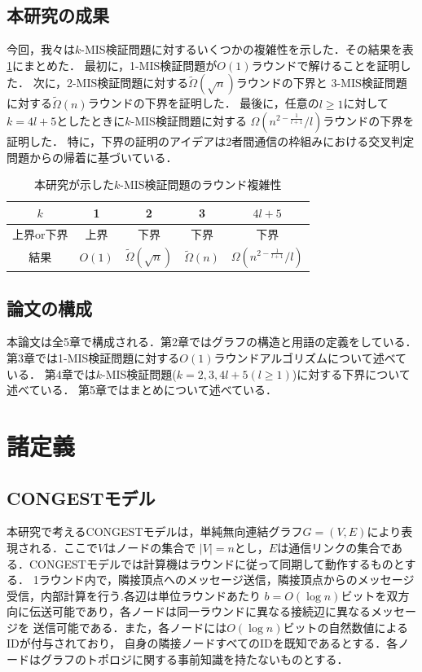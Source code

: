 \documentclass[12pt]{thesis}
\newcommand{\CONGEST}{\textsf{CONGEST}}
\theoremstyle{definition}
\begin{document}
\section{本研究の成果}
今回，我々は$k$-MIS検証問題に対するいくつかの複雑性を示した．その結果を表\ref{tab: k-MIS}にまとめた．
最初に，1-MIS検証問題が$O(1)$ラウンドで解けることを証明した．
次に，2-MIS検証問題に対する$\tilde{\Omega} (\sqrt{n})$ラウンドの下界と
3-MIS検証問題に対する$\tilde{\Omega} (n)$ラウンドの下界を証明した．
最後に，任意の$l \geq 1$に対して$k = 4l + 5$としたときに$k$-MIS検証問題に対する
$\Omega\left(n^{2 - \frac{1}{l+1}}/l\right)$ラウンドの下界を証明した．
特に，下界の証明のアイデアは2者間通信の枠組みにおける交叉判定問題からの帰着に基づいている．

\begin{table}[htb]
  \begin{center}
    \caption{本研究が示した$k$-MIS検証問題のラウンド複雑性}
    \begin{tabular}{|c||c|c|c|c|} \hline
      $k$ & 1 & 2 & 3 & $4l + 5$ \\ \hline
      上界or下界 & 上界 & 下界 & 下界 & 下界 \\ \hline
      結果 & $O(1)$ & $\tilde{\Omega} (\sqrt{n})$ & $\tilde{\Omega} (n)$ & $\Omega\left(n^{2 - \frac{1}{l+1}}/l\right)$ \\ \hline
    \end{tabular}
    \label{tab: k-MIS}
  \end{center}
\end{table}


\section{論文の構成}
本論文は全5章で構成される．第2章ではグラフの構造と用語の定義をしている．
第3章では1-MIS検証問題に対する$O(1)$ラウンドアルゴリズムについて述べている．
第4章では$k$-MIS検証問題($k = 2, 3, 4l + 5 ( l \geq 1)$)に対する下界について述べている．
第5章ではまとめについて述べている．

\chapter{諸定義}

\section{{\CONGEST}モデル}
本研究で考える{\CONGEST}モデルは，単純無向連結グラフ$G = (V, E)$により表現される．ここで$V$はノードの集合で
$|V| = n$とし，$E$は通信リンクの集合である．{\CONGEST}モデルでは計算機はラウンドに従って同期して動作するものとする．
1ラウンド内で，隣接頂点へのメッセージ送信，隣接頂点からのメッセージ受信，内部計算を行う.各辺は単位ラウンドあたり
$b = O(\log n)$ビットを双方向に伝送可能であり，各ノードは同一ラウンドに異なる接続辺に異なるメッセージを
送信可能である．また，各ノードには$O(\log n)$ビットの自然数値によるIDが付与されており，
自身の隣接ノードすべてのIDを既知であるとする．各ノードはグラフのトポロジに関する事前知識を持たないものとする．
\end{document}

